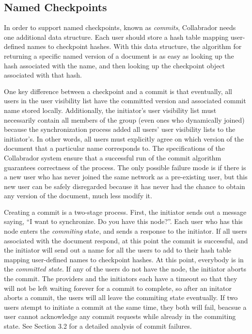 \documentclass[11pt,titlepage]{article}
\begin{document}
\subsection{Named Checkpoints}

In order to support named checkpoints, known as \emph{commits},
Collabrador needs one additional data structure. Each user should
store a hash table mapping user-defined names to checkpoint hashes.
With this data structure, the algorithm for returning a specific named
version of a document is as easy as looking up the hash associated
with the name, and then looking up the checkpoint object associated
with that hash.

One key difference between a checkpoint and a commit is that
eventually, all users in the user visibility list have the committed
version and associated commit name stored locally. Additionally, the
initiator's user visibility list must necessarily contain all members
of the group (even ones who dynamically joined) because the
synchronization process added all users' user visibility lists to the
initiator's. In other words, all users must explicitly agree on which
version of the document that a particular name corresponds to.  The
specifications of the Collabrador system ensure that a successful run
of the commit algorithm guarantees correctness of the process. The
only possible failure mode is if there is a new user who has never
joined the same network as a pre-existing user, but this new user can
be safely disregarded because it has never had the chance to obtain
any version of the document, much less modify it.

Creating a commit is a two-stage process. First, the initiator sends
out a message saying, ``I want to synchronize. Do you have this
node?''. Each user who has this node enters the \emph{commiting}
state, and sends a response to the initiator. If all users associated
with the document respond, at this point the commit is successful, and
the initiator will send out a name for all the users to add to their
hash table mapping user-defined names to checkpoint hashes. At this
point, everybody is in the \emph{committed state}. If any of the users
do not have the node, the initiator aborts the commit. The providers
and the initiators each have a timeout so that they will not be left
waiting forever for a commit to complete, so after an initator aborts
a commit, the users will all leave the commiting state eventually. If
two users atempt to initiate a commit at the same time, they both will
fail, beacsue a user cannot acknowledge any commit requests while
already in the commiting state. See Section 3.2 %
for a detailed analysis of commit failures.
\end{document}
